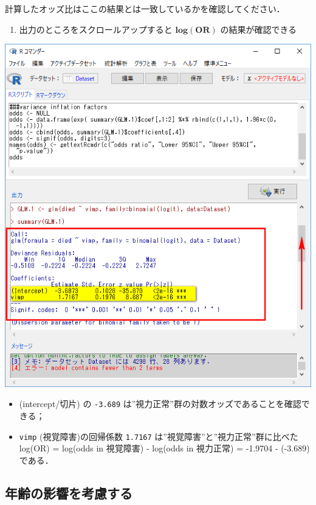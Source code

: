 \documentclass[11pt,]{problemset}
\providecommand{\tightlist}{%
  \setlength{\itemsep}{0pt}\setlength{\parskip}{0pt}}
\begin{document}
計算したオッズ比はここの結果とは一致しているかを確認してください．

\begin{enumerate}
\def\labelenumi{\arabic{enumi}.}
\setcounter{enumi}{9}
\tightlist
\item
  出力のところをスクロールアップすると \(\mathbf{log(OR)}\)
  の結果が確認できる
\end{enumerate}

\begin{center}\includegraphics[width=0.52\linewidth]{pic/logstic09} \end{center}

\begin{itemize}
\tightlist
\item
  (intercept/切片) の \texttt{-3.689}
  は''視力正常''群の対数オッズであることを確認できる；
\item
  \texttt{vimp} (視覚障害)の回帰係数 \texttt{1.7167}
  は''視覚障害''と''視力正常''群に比べた log(OR) = log(odds in 視覚障害)
  - log(odds in 視力正常) = -1.9704 - (-3.689)である．
\end{itemize}

\subsection{年齢の影響を考慮する}
\end{document}
